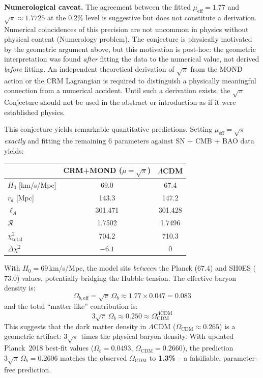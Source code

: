 \documentclass[aps,prd,twocolumn,superscriptaddress,nofootinbib,floatfix]{revtex4-2}
\begin{document}
\textbf{Numerological caveat.} The agreement between the fitted $\mu_{\mathrm{eff}} = 1.77$ and $\sqrt{\pi} \approx 1.7725$ at the 0.2\% level is suggestive but does not constitute a derivation. Numerical coincidences of this precision are not uncommon in physics without physical content (Numerology problem). The conjecture is physically motivated by the geometric argument above, but this motivation is post-hoc: the geometric interpretation was found \emph{after} fitting the data to the numerical value, not derived \emph{before} fitting. An independent theoretical derivation of $\sqrt{\pi}$ from the MOND action or the CRM Lagrangian is required to distinguish a physically meaningful connection from a numerical accident. Until such a derivation exists, the $\sqrt{\pi}$ Conjecture should not be used in the abstract or introduction as if it were established physics.

This conjecture yields remarkable quantitative predictions. Setting $\mu_{\mathrm{eff}} = \sqrt{\pi}$ \textit{exactly} and fitting the remaining 6 parameters against SN + CMB + BAO data yields:
\begin{center}
\begin{tabular}{lcc}
\toprule
& CRM+MOND ($\mu = \sqrt{\pi}$) & $\Lambda$CDM \\
\midrule
$H_0$ [km/s/Mpc] & $\mathbf{69.0}$ & 67.4 \\
$r_d$ [Mpc] & 143.3 & 147.2 \\
$\ell_A$ & 301.471 & 301.428 \\
$\mathcal{R}$ & 1.7502 & 1.7496 \\
$\chi^2_{\mathrm{total}}$ & $\mathbf{704.2}$ & 710.3 \\
$\Delta\chi^2$ & $\mathbf{-6.1}$ & 0 \\
\bottomrule
\end{tabular}
\end{center}
With $H_0 = 69$\,km/s/Mpc, the model sits \textit{between} the Planck ($67.4$) and SH0ES ($73.0$) values, potentially bridging the Hubble tension. The effective baryon density is:
\begin{equation}
\Omega_{b,\mathrm{eff}} = \sqrt{\pi}\,\Omega_b \approx 1.77 \times 0.047 = 0.083
\end{equation}
and the total ``matter-like'' contribution is:
\begin{equation}
3\sqrt{\pi}\,\Omega_b \approx 0.250 \approx \Omega_{\mathrm{CDM}}^{\Lambda\mathrm{CDM}}
\end{equation}
This suggests that the dark matter density in $\Lambda$CDM ($\Omega_{\mathrm{CDM}} \approx 0.265$) is a geometric artifact: $3\sqrt{\pi}$ times the physical baryon density. With updated Planck~2018 best-fit values ($\Omega_b = 0.0493$, $\Omega_{\mathrm{CDM}} = 0.2660$), the prediction $3\sqrt{\pi}\,\Omega_b = 0.2606$ matches the observed $\Omega_{\mathrm{CDM}}$ to \textbf{1.3\%} -- a falsifiable, parameter-free prediction.
\end{document}
